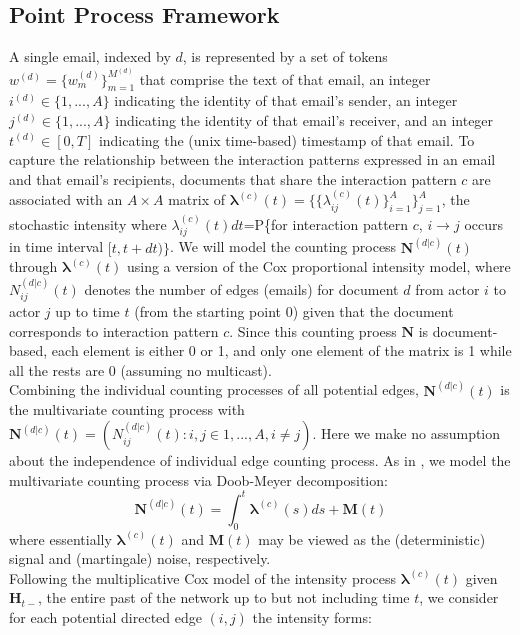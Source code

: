 \documentclass[a4paper]{article}
\begin{document}
\subsection{Point Process Framework}
A single email, indexed by $d$, is represented by a set of tokens $w^{(d)} = \{w^{(d)}_m \}_{m=1}^{M^{(d)}}$ that comprise the
text of that email, an integer $i^{(d)} \in \{1,...,A\}$ indicating the identity of that email’s sender, an integer $j^{(d)} \in \{1,...,A\}$ indicating the identity of that email’s receiver, and an integer $t^{(d)} \in [0, T]$ indicating the (unix time-based) timestamp of that email. To capture the relationship between the interaction patterns expressed in an email and that email’s recipients, documents that share the interaction pattern $c$ are associated with an $A\times A$ matrix of $\boldsymbol{\lambda}^{(c)}(t)=\{\{\lambda^{(c)}_{ij}(t)\}_{i=1}^{A}\}_{j=1}^{A}$, the stochastic intensity where $\lambda^{(c)}_{ij}(t)dt$=P\{for interaction pattern $c$, $i\rightarrow j$ occurs in time interval $[t, t+dt)\}$. We will model the counting process $\mathbf{N}^{(d|c)}(t)$ through $\boldsymbol{\lambda}^{(c)}(t)$ using a version of the Cox proportional intensity model, where $N_{ij}^{(d|c)}(t)$ denotes the number of edges (emails) for document $d$ from actor $i$ to actor $j$ up to time $t$ (from the starting point 0) given that the document corresponds to interaction pattern $c$. Since this counting proess $\mathbf{N}$ is document-based, each element is either 0 or 1, and only one element of the matrix is 1 while all the rests are 0 (assuming no multicast). \\ \newline Combining the individual counting processes of all potential edges,  $\mathbf{N}^{(d|c)}(t)$ is the multivariate counting process with $\mathbf{N}^{(d|c)}(t)=(N^{(d|c)}_{ij}(t): i, j \in {1, ..., A}, i \neq j)$. Here we make no assumption about the independence of individual edge counting process. As in \cite{Vu2011}, we model the multivariate counting process via Doob-Meyer decomposition:
\begin{equation}
\mathbf{N}^{(d|c)}(t)=\int_0^t\boldsymbol{\lambda}^{(c)}(s)ds + \mathbf{M}(t)
\end{equation}
where essentially $\boldsymbol{\lambda}^{(c)}(t)$ and $\mathbf{M}(t)$ may be viewed as the (deterministic) signal and (martingale) noise, respectively.\\ \newline
Following the multiplicative Cox model of the intensity process $\boldsymbol{\lambda}^{(c)}(t)$ given $\boldsymbol{H}_{t-}$, the entire past of the network up to but not including time $t$, we consider for each potential directed edge $(i, j)$ the intensity forms:
\end{document}
